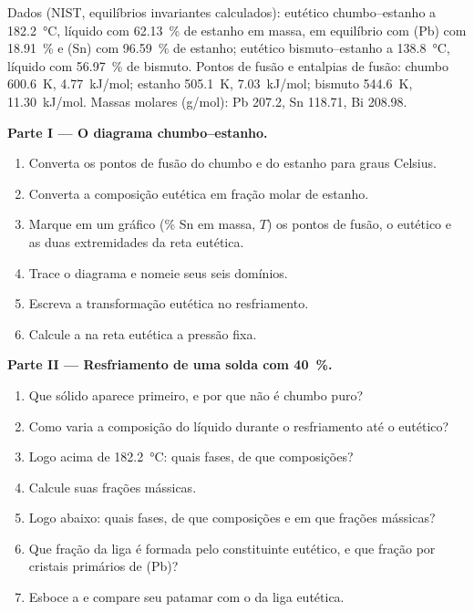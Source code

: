 \begin{problem}
\label{pb:b2:solid-liquid-diagrams:1}
Dados (NIST, equilíbrios invariantes calculados): eutético chumbo--estanho a
\qty{182.2}{\degreeCelsius}, líquido com 62.13~\% de estanho em massa, em
equilíbrio com (Pb) com 18.91~\% e (Sn) com 96.59~\% de estanho; eutético
bismuto--estanho a \qty{138.8}{\degreeCelsius}, líquido com 56.97~\% de
bismuto. Pontos de fusão e entalpias de fusão: chumbo \qty{600.6}{K},
\qty{4.77}{kJ/mol}; estanho \qty{505.1}{K}, \qty{7.03}{kJ/mol}; bismuto
\qty{544.6}{K}, \qty{11.30}{kJ/mol}. Massas molares (\unit{g/mol}): Pb 207.2,
Sn 118.71, Bi 208.98.

\medskip
\noindent\textbf{Parte I --- O diagrama chumbo--estanho.}
\begin{enumerate}
  \item Converta os pontos de fusão do chumbo e do estanho para graus Celsius.
  \item Converta a composição eutética em fração molar de estanho.
  \item Marque em um gráfico (\% Sn em massa, $T$) os pontos de fusão, o
        eutético e as duas extremidades da reta eutética.
  \item Trace o diagrama e nomeie seus seis domínios.
  \item Escreva a transformação eutética no resfriamento.
  \item Calcule a  na reta eutética a pressão fixa.
\end{enumerate}

\medskip
\noindent\textbf{Parte II --- Resfriamento de uma solda com 40~\%.}
\begin{enumerate}[resume]
  \item Que sólido aparece primeiro, e por que não é chumbo puro?
  \item Como varia a composição do líquido durante o resfriamento até o
        eutético?
  \item Logo acima de \qty{182.2}{\degreeCelsius}: quais fases, de que
        composições?
  \item Calcule suas frações mássicas.
  \item Logo abaixo: quais fases, de que composições e em que frações
        mássicas?
  \item Que fração da liga é formada pelo constituinte eutético, e que fração
        por cristais primários de (Pb)?
  \item Esboce a  e compare seu patamar com o da liga
        eutética.
\end{enumerate}


\end{problem}
